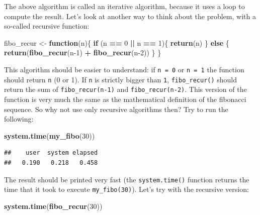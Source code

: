 \documentclass[]{gitbook}
\newenvironment{Shaded}{\begin{snugshade}}{\end{snugshade}}
\newcommand{\ControlFlowTok}[1]{\textcolor[rgb]{0.13,0.29,0.53}{\textbf{#1}}}
\newcommand{\DecValTok}[1]{\textcolor[rgb]{0.00,0.00,0.81}{#1}}
\newcommand{\KeywordTok}[1]{\textcolor[rgb]{0.13,0.29,0.53}{\textbf{#1}}}
\newcommand{\NormalTok}[1]{#1}
\newcommand{\OperatorTok}[1]{\textcolor[rgb]{0.81,0.36,0.00}{\textbf{#1}}}
\newcommand{\StringTok}[1]{\textcolor[rgb]{0.31,0.60,0.02}{#1}}
\theoremstyle{definition}
\theoremstyle{definition}
\theoremstyle{definition}
\theoremstyle{remark}
\begin{document}
The above algorithm is called an iterative algorithm, because it uses a
loop to compute the result. Let's look at another way to think about the
problem, with a so-called recursive function:

\begin{Shaded}
\begin{Highlighting}[]
\NormalTok{fibo_recur <-}\StringTok{ }\ControlFlowTok{function}\NormalTok{(n)\{}
 \ControlFlowTok{if}\NormalTok{ (n }\OperatorTok{==}\StringTok{ }\DecValTok{0} \OperatorTok{||}\StringTok{ }\NormalTok{n }\OperatorTok{==}\StringTok{ }\DecValTok{1}\NormalTok{)\{}
   \KeywordTok{return}\NormalTok{(n)}
\NormalTok{   \} }\ControlFlowTok{else}\NormalTok{ \{}
     \KeywordTok{return}\NormalTok{(}\KeywordTok{fibo_recur}\NormalTok{(n}\DecValTok{-1}\NormalTok{) }\OperatorTok{+}\StringTok{ }\KeywordTok{fibo_recur}\NormalTok{(n}\DecValTok{-2}\NormalTok{))}
\NormalTok{   \}}
\NormalTok{\}}
\end{Highlighting}
\end{Shaded}

This algorithm should be easier to understand: if \texttt{n\ =\ 0} or
\texttt{n\ =\ 1} the function should return \texttt{n} (0 or 1). If
\texttt{n} is strictly bigger than \texttt{1}, \texttt{fibo\_recur()}
should return the sum of \texttt{fibo\_recur(n-1)} and
\texttt{fibo\_recur(n-2)}. This version of the function is very much the
same as the mathematical definition of the fibonacci sequence. So why
not use only recursive algorithms then? Try to run the following:

\begin{Shaded}
\begin{Highlighting}[]
\KeywordTok{system.time}\NormalTok{(}\KeywordTok{my_fibo}\NormalTok{(}\DecValTok{30}\NormalTok{))}
\end{Highlighting}
\end{Shaded}

\begin{verbatim}
##    user  system elapsed 
##   0.190   0.218   0.458
\end{verbatim}

The result should be printed very fast (the \texttt{system.time()}
function returns the time that it took to execute
\texttt{my\_fibo(30)}). Let's try with the recursive version:

\begin{Shaded}
\begin{Highlighting}[]
\KeywordTok{system.time}\NormalTok{(}\KeywordTok{fibo_recur}\NormalTok{(}\DecValTok{30}\NormalTok{))}
\end{Highlighting}
\end{Shaded}
\end{document}
